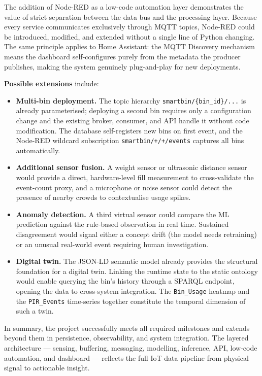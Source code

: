 \documentclass[10pt,a4paper]{article}
\begin{document}
The addition of Node-RED as a low-code automation layer demonstrates the value of strict separation between the data bus and the processing layer. Because every service communicates exclusively through MQTT topics, Node-RED could be introduced, modified, and extended without a single line of Python changing. The same principle applies to Home Assistant: the MQTT Discovery mechanism means the dashboard self-configures purely from the metadata the producer publishes, making the system genuinely plug-and-play for new deployments.

\textbf{Possible extensions} include:

\begin{itemize}
\item \textbf{Multi-bin deployment.} The topic hierarchy
\texttt{smartbin/\{bin\_id\}/...} is already parameterised; deploying a second
bin requires only a configuration change and the existing broker, consumer,
and API handle it without code modification. The database self-registers new bins
on first event, and the Node-RED wildcard subscription \texttt{smartbin/+/+/events}
captures all bins automatically.
\item \textbf{Additional sensor fusion.} A weight sensor or ultrasonic distance
sensor would provide a direct, hardware-level fill measurement to cross-validate
the event-count proxy, and a microphone or noise sensor could detect the
presence of nearby crowds to contextualise usage spikes.
\item \textbf{Anomaly detection.} A third virtual sensor could compare the ML
prediction against the rule-based observation in real time. Sustained
disagreement would signal either a concept drift (the model needs retraining)
or an unusual real-world event requiring human investigation.
\item \textbf{Digital twin.} The JSON-LD semantic model already provides the
structural foundation for a digital twin. Linking the runtime state to the
static ontology would enable querying the bin's history through a SPARQL
endpoint, opening the data to cross-system integration. The \texttt{Bin\_Usage}
heatmap and the \texttt{PIR\_Events} time-series together constitute the
temporal dimension of such a twin.
\end{itemize}

In summary, the project successfully meets all required milestones and extends beyond
them in persistence, observability, and system integration. The layered architecture ---
sensing, buffering, messaging, modelling, inference, API, low-code automation, and dashboard --- reflects the
full IoT data pipeline from physical signal to actionable insight.
\end{document}
